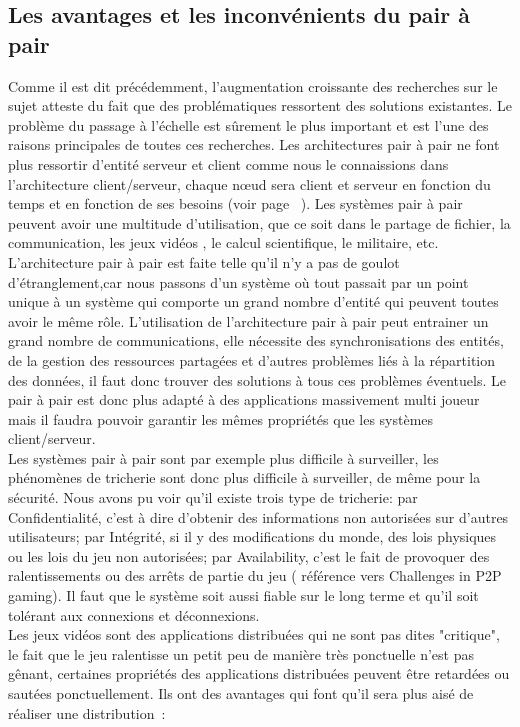 	\subsection{Les avantages et les inconvénients du pair à pair}
	Comme il est dit précédemment, l'augmentation croissante des recherches sur le sujet atteste du fait que des problématiques ressortent des solutions existantes. Le problème du passage à l'échelle est sûrement le plus important et est l'une des raisons principales de toutes ces recherches. Les architectures pair à pair ne font plus ressortir d'entité serveur et client comme nous le connaissions dans l'architecture client/serveur, chaque nœud sera client et serveur en fonction du temps et en fonction de ses besoins (voir page ~\pageref{P2P/ClServ}). Les systèmes pair à pair peuvent avoir une multitude d'utilisation, que ce soit dans le partage de fichier, la communication, les jeux vidéos , le calcul scientifique, le militaire, etc. \\
	L'architecture pair à pair est faite telle qu'il n'y a pas de goulot d'étranglement,car nous passons d'un système où tout passait par un point unique à un système qui comporte un grand nombre d'entité qui peuvent toutes avoir le même rôle. L'utilisation de l'architecture pair à pair peut entrainer un grand nombre de communications, elle nécessite des synchronisations des entités, de la gestion des ressources partagées et d'autres problèmes liés à la répartition des données, il faut donc trouver des solutions à tous ces problèmes éventuels. Le pair à pair est donc plus adapté à des applications massivement multi joueur mais il faudra pouvoir garantir les mêmes propriétés que les systèmes client/serveur. \\
	Les systèmes pair à pair sont par exemple plus difficile à surveiller, les phénomènes de tricherie sont donc plus difficile à surveiller, de même pour la sécurité. Nous avons pu voir qu'il existe trois type de tricherie: par Confidentialité, c'est à dire d'obtenir des informations non autorisées sur d'autres utilisateurs; par Intégrité, si il y des modifications du monde, des lois physiques ou les lois du jeu non autorisées; par Availability, c'est le fait de provoquer des ralentissements ou des arrêts de partie du jeu ( référence vers Challenges in P2P gaming). Il faut que le système soit aussi fiable sur le long terme et qu'il soit tolérant aux connexions et déconnexions.\\
	Les jeux vidéos sont des applications distribuées qui ne sont pas dites "critique", le fait que le jeu ralentisse un petit peu de manière très ponctuelle n'est pas gênant, certaines propriétés des applications distribuées peuvent être retardées ou sautées ponctuellement. Ils ont des avantages qui font qu'il sera plus aisé de réaliser une distribution~\cite{1267692}:

